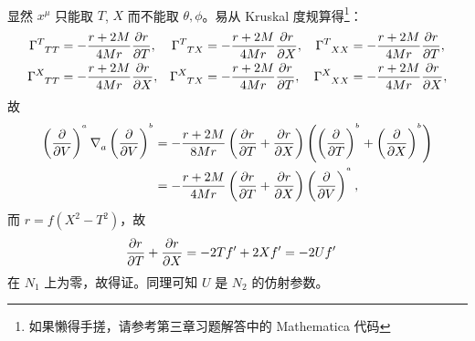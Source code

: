 \begin{xiti}
\begin{zm}
\begin{enumerate}[label = (\arabic*)]
\begin{align*}
				\end{align*}
				显然 $x^\mu$ 只能取 $T$, $X$ 而不能取 $\theta, \phi$。易从 Kruskal 度规算得\footnote{如果懒得手搓，请参考第三章习题解答中的 Mathematica 代码}：
				\begin{align*}
					\ChristoffelSymbol{T}{T}{T} &= - \frac{r + 2M}{4Mr} \pdv{r}{T}, & \ChristoffelSymbol{T}{T}{X} &= - \frac{r + 2M}{4Mr} \pdv{r}{X}, & \ChristoffelSymbol{T}{X}{X} &= - \frac{r + 2M}{4Mr} \pdv{r}{T},\\
					\ChristoffelSymbol{X}{T}{T} &= - \frac{r + 2M}{4Mr} \pdv{r}{X}, & \ChristoffelSymbol{X}{T}{X} &= - \frac{r + 2M}{4Mr} \pdv{r}{T}, & \ChristoffelSymbol{X}{X}{X} &= - \frac{r + 2M}{4Mr} \pdv{r}{X},
				\end{align*}
				故
				\begin{align*}
					\tensorp{V}{^a} \Nabla{a} \tensorp{V}{^b} &= -\frac{r + 2M}{8Mr} \left( \pdv{r}{T} + \pdv{r}{X} \right) \left( \tensorp{T}{^b} + \tensorp{X}{^b} \right)\\
					&= - \frac{r + 2M}{4Mr} \left( \pdv{r}{T} + \pdv{r}{X} \right) \tensorp{V}{^a},
				\end{align*}
				而 $r = f(X^2 - T^2)$，故
				\begin{align*}
					\pdv{r}{T} + \pdv{r}{X} &= -2 T f' + 2X f' = - 2 U f'
				\end{align*}
				在 $N_1$ 上为零，故得证。同理可知 $U$ 是 $N_2$ 的仿射参数。


\end{enumerate}
\end{zm}
\end{xiti}
